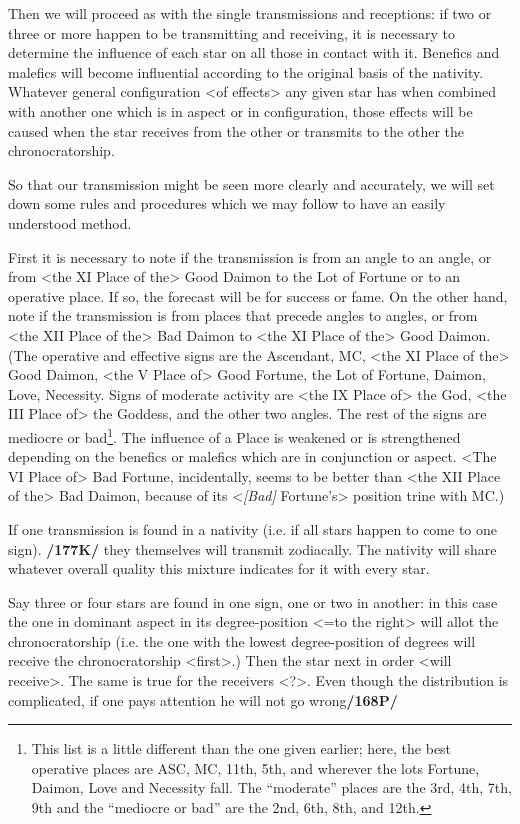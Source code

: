 Then we will proceed as with the single transmissions and receptions: if two or three or more happen to be transmitting and receiving, it is necessary to determine the influence of each star on all those in contact with it. Benefics and malefics will become influential according to the original basis of the nativity. Whatever general configuration <of effects> any given star has when combined with another one
which is in aspect or in configuration, those effects will be caused when the star receives from the other or transmits to the other the chronocratorship.

So that our transmission might be seen more clearly and accurately, we will set down some rules and procedures which we may follow to have an easily understood method. 

First it is necessary to note if the transmission is from an angle to an angle, or from <the XI Place of the> Good Daimon to the Lot of Fortune or to an operative place. If so, the forecast will be for success or fame. On the other hand, note if the transmission is from places that precede angles to angles, or from <the XII Place of the> Bad Daimon
to <the XI Place of the> Good Daimon. (The operative and effective signs are the Ascendant, MC, <the XI Place of the> Good Daimon, <the V Place of> Good Fortune, the Lot of Fortune, Daimon, Love, Necessity. Signs of moderate activity are <the IX Place of> the God, <the III Place of> the Goddess, and the other two angles. The rest of the signs are mediocre or bad\footnote{This list is a little different than the one given earlier; here, the best operative places are ASC, MC, 11th, 5th, and wherever the lots Fortune, Daimon, Love and Necessity fall. The ``moderate'' places are the 3rd, 4th, 7th, 9th and the ``mediocre or bad'' are the 2nd, 6th, 8th, and 12th.}. The influence of a Place is weakened or is strengthened depending on the benefics or malefics which are in conjunction or aspect. <The VI Place of> Bad Fortune, incidentally, seems to be better than <the XII Place of the> Bad Daimon, because of its <\textsl{[Bad]} Fortune’s> position trine with MC.)

If one transmission is found in a nativity (i.e. if all stars happen to come to one sign). \textbf{/177K/} they themselves will transmit zodiacally. The nativity will share whatever overall quality this mixture indicates for it with every star. 

Say three or four stars are found in one sign, one or two in another: in this case the one in dominant aspect in its degree-position <=to the right> will allot the chronocratorship (i.e. the one with the lowest degree-position of degrees will receive the chronocratorship <first>.) Then the star next in order <will receive>. The same is true for the receivers <?>. Even though the distribution is complicated, if one pays attention he will not go wrong\textbf{/168P/}

